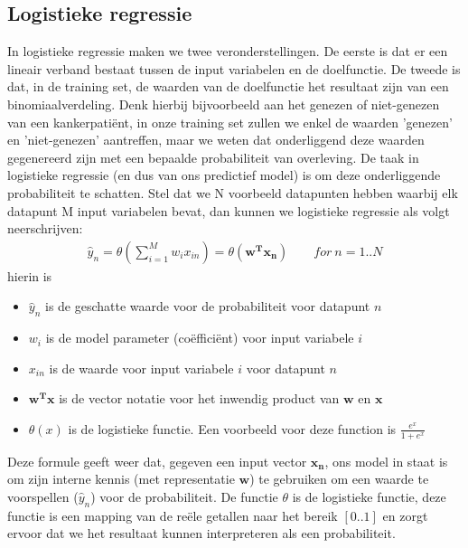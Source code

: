 \begin{abstract*}
\subsection{Logistieke regressie}
\label{subsec:D:pm-logistieke-regressie}
In logistieke regressie maken we twee veronderstellingen. De eerste is dat er een lineair verband bestaat tussen de input variabelen en de doelfunctie. De tweede is dat, in de training set, de waarden van de doelfunctie het resultaat zijn van een binomiaalverdeling. Denk hierbij bijvoorbeeld aan het genezen of niet-genezen van een kankerpati\"ent, in onze training set zullen we enkel de waarden 'genezen' en 'niet-genezen' aantreffen, maar we weten dat onderliggend deze waarden gegenereerd zijn met een bepaalde probabiliteit van overleving. De taak in logistieke regressie (en dus van ons predictief model) is om deze onderliggende probabiliteit te schatten. Stel dat we N voorbeeld datapunten hebben waarbij elk datapunt M input variabelen bevat, dan kunnen we logistieke regressie als volgt neerschrijven:
\begin{equation}
\begin{split}
\hat{y}_{n} = \theta(\sum_{i=1}^{M}w_{i}x_{in})= \theta(\bm{w^{T}x_{n}}) \qquad for\ n=1..N
\end{split}
\end{equation}
hierin is
\begin{itemize}
	\item $\hat{y}_{n}$ is de geschatte waarde voor de probabiliteit voor datapunt $n$
	\item $w_{i}$ is de model parameter (co\"effici\"ent) voor input variabele $i$
	\item $x_{in}$ is de waarde voor input variabele $i$ voor datapunt $n$
	\item $\bm{w^{T}x}$ is de vector notatie voor het inwendig product van $\bm{w}$ en $\bm{x}$
	\item $\theta(x)$ is de logistieke functie. Een voorbeeld voor deze function is $\frac{e^{x}}{1+e^{x}}$
\end{itemize}
Deze formule geeft weer dat, gegeven een input vector $\bm{x_{n}}$, ons model in staat is om zijn interne kennis (met representatie $\bm{w}$) te gebruiken om een waarde te voorspellen ($\hat{y}_{n}$) voor de probabiliteit. De functie $\theta$ is de logistieke functie, deze functie is een mapping van de re\"ele getallen naar het bereik $[0..1]$ en zorgt ervoor dat we het resultaat kunnen interpreteren als een probabiliteit.


\end{abstract*}
